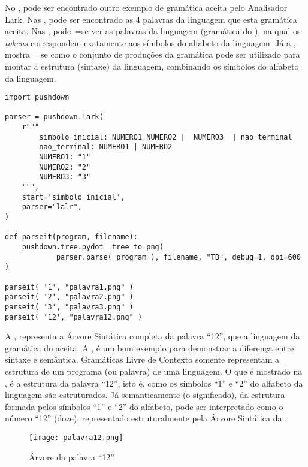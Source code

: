 No ,
pode ser encontrado outro exemplo de gramática aceita pelo Analisador Lark.
Nas ,
pode ser encontrado as 4 palavras da linguagem que esta gramática aceita.
Nas ,
pode~=se ver as palavras da linguagem (gramática do ),
na qual os \textit{tokens} correspondem exatamente aos símbolos do alfabeto da linguagem.
Já a ,
mostra~=se como o conjunto de produções da gramática pode ser utilizado para montar a estrutura (sintaxe) da linguagem,
combinando os símbolos do alfabeto da linguagem.
\begin{code}
\caption{Exemplo de gramática com uma Estrutura de Sintaxe}
\label{code:ExemploDeEstruturaDeGramaticaLark}
\begin{verbatim}
import pushdown

parser = pushdown.Lark(
    r"""
        simbolo_inicial: NUMERO1 NUMERO2 |  NUMERO3  | nao_terminal
        nao_terminal: NUMERO1 | NUMERO2
        NUMERO1: "1"
        NUMERO2: "2"
        NUMERO3: "3"
    """,
    start='simbolo_inicial',
    parser="lalr",
)

def parseit(program, filename):
    pushdown.tree.pydot__tree_to_png(
            parser.parse( program ), filename, "TB", debug=1, dpi=600 )

parseit( '1', "palavra1.png" )
parseit( '2', "palavra2.png" )
parseit( '3', "palavra3.png" )
parseit( '12', "palavra12.png" )
\end{verbatim}
\end{code}

A ,
representa a Árvore Sintática completa da palavra ``12'',
que a linguagem da gramática do  aceita.
A ,
é um bom exemplo para demonstrar a diferença entre sintaxe e
semântica.
Gramáticas Livre de Contexto somente representam a estrutura de um programa (ou palavra) de uma linguagem.
O que é mostrado na ,
é a estrutura da palavra ``12'',
isto é,
como os símbolos ``1'' e
``2'' do alfabeto da linguagem são estruturados.
Já semanticamente (o significado),
da estrutura formada pelos símbolos ``1'' e
``2'' do alfabeto,
pode ser interpretado como o número ``12'' (doze),
representado estruturalmente pela Árvore Sintática da .
\begin{figure}[H]
\caption{Árvore da palavra ``12''}
\label{figure:palavra12}
\centering
\texttt{[image: palavra12.png]}
\end{figure}

